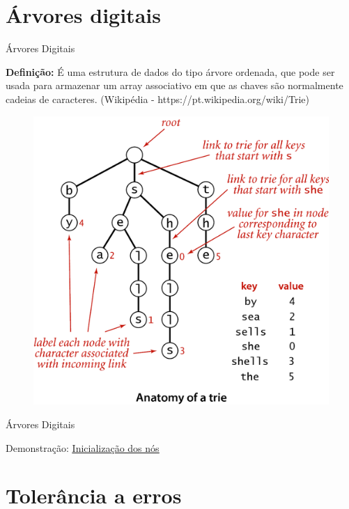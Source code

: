 \documentclass[11pt]{beamer}
\begin{document}
\section{Árvores digitais}

\begin{frame}[fragile]{Árvores Digitais}

    \textbf{Definição:} É uma estrutura de dados do tipo árvore ordenada, que pode ser usada para armazenar um array associativo em que as chaves são normalmente cadeias de caracteres. (Wikipédia - https://pt.wikipedia.org/wiki/Trie)

    \pause
    \begin{figure}
      \includegraphics[scale=0.13]{pictures/trie_anatomy.png}
      \centering
    \end{figure}

\end{frame}

\begin{frame}[fragile]{Árvores Digitais}

    Demonstração: \href{https://www.cs.usfca.edu/~galles/visualization/Trie.html}{\color{blue}\underline{Inicialização dos nós}}

\end{frame}

\section{Tolerância a erros}
\end{document}
